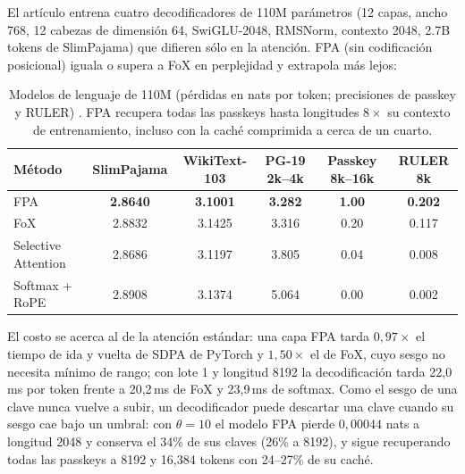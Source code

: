 El artículo entrena cuatro decodificadores de 110M parámetros (12 capas, ancho 768, 12 cabezas de dimensión 64, SwiGLU-2048, RMSNorm, contexto 2048, 2.7B tokens de SlimPajama) que difieren sólo en la atención. FPA (sin codificación posicional) iguala o supera a FoX en perplejidad y extrapola más lejos:

\begin{table}[H]
\centering
\footnotesize
\begin{tabular}{lccccc}
\toprule
\textbf{Método} & \textbf{SlimPajama} & \textbf{WikiText-103} & \textbf{PG-19 2k--4k} & \textbf{Passkey 8k--16k} & \textbf{RULER 8k} \\
\midrule
FPA & \textbf{2.8640} & \textbf{3.1001} & \textbf{3.282} & \textbf{1.00} & \textbf{0.202} \\
FoX & 2.8832 & 3.1425 & 3.316 & 0.20 & 0.117 \\
Selective Attention & 2.8686 & 3.1197 & 3.805 & 0.04 & 0.008 \\
Softmax + RoPE & 2.8908 & 3.1374 & 5.064 & 0.00 & 0.002 \\
\bottomrule
\end{tabular}
\caption{Modelos de lenguaje de 110M (pérdidas en nats por token; precisiones de passkey y RULER) \citep{liu_first_passage_2026}. FPA recupera todas las passkeys hasta longitudes $8\times$ su contexto de entrenamiento, incluso con la caché comprimida a cerca de un cuarto.}
\label{tab:fpa-lm-es}
\end{table}

El costo se acerca al de la atención estándar: una capa FPA tarda $0{,}97\times$ el tiempo de ida y vuelta de SDPA de PyTorch y $1{,}50\times$ el de FoX, cuyo sesgo no necesita mínimo de rango; con lote 1 y longitud 8192 la decodificación tarda 22{,}0\,ms por token frente a 20{,}2\,ms de FoX y 23{,}9\,ms de softmax. Como el sesgo de una clave nunca vuelve a subir, un decodificador puede descartar una clave cuando su sesgo cae bajo un umbral: con $\theta=10$ el modelo FPA pierde $0{,}00044$ nats a longitud 2048 y conserva el 34\% de sus claves (26\% a 8192), y sigue recuperando todas las passkeys a 8192 y 16{,}384 tokens con 24--27\% de su caché.

